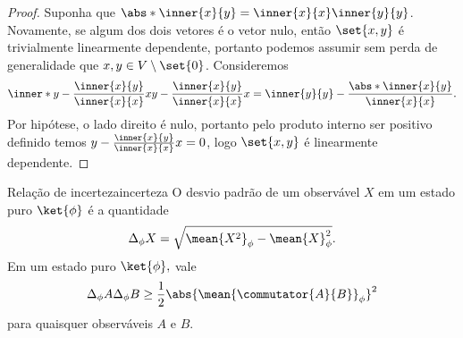 \begin{proof}
    Suponha que \(\abs*{\inner{x}{y}} = \inner{x}{x} \inner{y}{y}\). Novamente, se algum dos dois vetores é o vetor nulo, então \(\set{x,y}\) é trivialmente linearmente dependente, portanto podemos assumir sem perda de generalidade que \(x, y \in V \setminus\set{0}\). Consideremos
    \begin{equation*}
        \inner*{y - \frac{\inner{x}{y}}{\inner{x}{x}}x}{y - \frac{\inner{x}{y}}{\inner{x}{x}}x} = \inner{y}{y} - \frac{\abs*{\inner{x}{y}}}{\inner{x}{x}}.
    \end{equation*}
    Por hipótese, o lado direito é nulo, portanto pelo produto interno ser positivo definido temos \(y - \frac{\inner{x}{y}}{\inner{x}{x}}x = 0\), logo \(\set{x,y}\) é linearmente dependente.
\end{proof}

\begin{lemma}{Relação de incerteza}{incerteza}
    O desvio padrão de um observável \(X\) em um estado puro \(\ket{\phi}\) é a quantidade
    \begin{equation*}
        \Delta_\phi X = \sqrt{\mean{X^2}_\phi - \mean{X}^2_\phi}.
    \end{equation*}
    Em um estado puro \(\ket{\phi},\) vale
    \begin{equation*}
        \Delta_\phi A \Delta_\phi B \geq \frac12 \abs{\mean{\commutator{A}{B}}_\phi}^2
    \end{equation*}
    para quaisquer observáveis \(A\) e \(B\).
\end{lemma}

